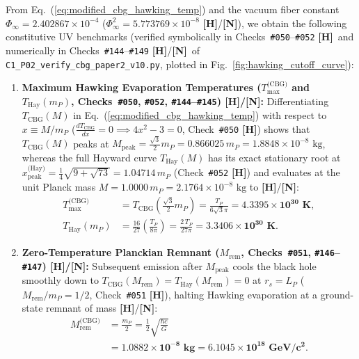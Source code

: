 \documentclass[11pt,a4paper]{article}
\newcommand{\catH}{\textbf{\textcolor{orange!85!black}{[H]}}}
\newcommand{\catN}{\textbf{\textcolor{teal!75!black}{[N]}}}
\theoremstyle{plain}
\theoremstyle{definition}
\theoremstyle{remark}
\numberwithin{equation}{section}
\begin{document}
From Eq.~(\ref{eq:modified_cbg_hawking_temp}) and the vacuum fiber constant $\Phi_{\infty} = 2.402867 \times 10^{-4}$ ($\Phi_{\infty}^2 = 5.773769 \times 10^{-8}$ \catH/\catN), we obtain the following constitutive UV benchmarks (verified symbolically in Checks~\texttt{\#050}--\texttt{\#052} \catH\ and numerically in Checks~\texttt{\#144}--\texttt{\#149} \catH/\catN\ of \allowbreak\texttt{C1\_P02\_verify\_cbg\_paper2\_v10.py}, plotted in Fig.~\ref{fig:hawking_cutoff_curve}):
\begin{enumerate}
    \item \textbf{Maximum Hawking Evaporation Temperatures ($T_{\max}^{\text{(CBG)}}$ and $T_{\text{Hay}}(m_P)$, Checks~\texttt{\#050}, \texttt{\#052}, \texttt{\#144}--\texttt{\#145}) \catH/\catN:} Differentiating $T_{\text{CBG}}(M)$ in Eq.~(\ref{eq:modified_cbg_hawking_temp}) with respect to $x \equiv M/m_P$ ($\frac{dT_{\text{CBG}}}{dx} = 0 \implies 4x^2 - 3 = 0$, Check~\texttt{\#050} \catH) shows that $T_{\text{CBG}}(M)$ peaks at $M_{\text{peak}} = \frac{\sqrt{3}}{2} m_P = 0.866025\,m_P = 1.8848 \times 10^{-8}\text{ kg}$, whereas the full Hayward curve $T_{\text{Hay}}(M)$ has its exact stationary root at $x_{\text{peak}}^{\text{(Hay)}} = \frac{1}{4}\sqrt{9 + \sqrt{73}} = 1.04714\,m_P$ (Check~\texttt{\#052} \catH) and evaluates at the unit Planck mass $M = 1.0000\,m_P = 2.1764 \times 10^{-8}\text{ kg}$ to \catH/\catN:
    \begin{align}
    T_{\max}^{\text{(CBG)}} &= T_{\text{CBG}}\!\left(\frac{\sqrt{3}}{2}m_P\right) = \frac{T_P}{6\sqrt{3}\pi} = \mathbf{4.3395 \times 10^{30}\text{ K}}, \nonumber \\[3pt]
    T_{\text{Hay}}\!\left(m_P\right) &= \frac{16}{27}\left(\frac{T_P}{8\pi}\right) = \frac{2\,T_P}{27\pi} = \mathbf{3.3406 \times 10^{30}\text{ K}}.
    \label{eq:t_max_cbg}
    \end{align}

    \item \textbf{Zero-Temperature Planckian Remnant ($M_{\text{rem}}$, Checks~\texttt{\#051}, \texttt{\#146}--\texttt{\#147}) \catH/\catN:} Subsequent emission after $M_{\text{peak}}$ cools the black hole smoothly down to $T_{\text{CBG}}(M_{\text{rem}}) = T_{\text{Hay}}(M_{\text{rem}}) = 0$ at $r_s = L_P$ ($M_{\text{rem}}/m_P = 1/2$, Check~\texttt{\#051} \catH), halting Hawking evaporation at a ground-state remnant of mass \catH/\catN:
    \begin{align}
    M_{\text{rem}}^{\text{(CBG)}} &= \frac{m_P}{2} = \frac{1}{2}\sqrt{\frac{\hbar c}{G}} \nonumber \\[3pt]
    &= \mathbf{1.0882 \times 10^{-8}\text{ kg}} = \mathbf{6.1045 \times 10^{18}\text{ GeV}/c^2}.
    \label{eq:planck_remnant_mass}
    \end{align}


\end{enumerate}
\end{document}
